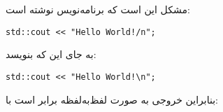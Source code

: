 \section{}
\paragraph{}\label{answer:69}
مشکل این است که برنامه‌نویس نوشته است:
\begin{LTR}
        \begin{lstlisting}[style=C++Style]
            std::cout << "Hello World!/n";
        \end{lstlisting}
\end{LTR}

به جای این که بنویسد:
\begin{LTR}
        \begin{lstlisting}[style=C++Style]
            std::cout << "Hello World!\n";
        \end{lstlisting}
\end{LTR}

بنابراین خروجی به صورت لفظ‌به‌لفظه برابر است با:
\LTR\noindent
{}
\RTL

